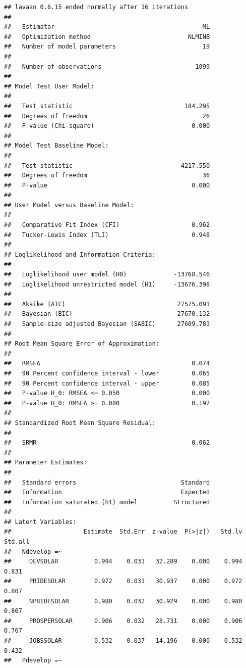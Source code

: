 \documentclass[
]{article}
\begin{document}
\begin{verbatim}
## lavaan 0.6.15 ended normally after 16 iterations
## 
##   Estimator                                         ML
##   Optimization method                           NLMINB
##   Number of model parameters                        19
## 
##   Number of observations                          1099
## 
## Model Test User Model:
##                                                       
##   Test statistic                               184.295
##   Degrees of freedom                                26
##   P-value (Chi-square)                           0.000
## 
## Model Test Baseline Model:
## 
##   Test statistic                              4217.550
##   Degrees of freedom                                36
##   P-value                                        0.000
## 
## User Model versus Baseline Model:
## 
##   Comparative Fit Index (CFI)                    0.962
##   Tucker-Lewis Index (TLI)                       0.948
## 
## Loglikelihood and Information Criteria:
## 
##   Loglikelihood user model (H0)             -13768.546
##   Loglikelihood unrestricted model (H1)     -13676.398
##                                                       
##   Akaike (AIC)                               27575.091
##   Bayesian (BIC)                             27670.132
##   Sample-size adjusted Bayesian (SABIC)      27609.783
## 
## Root Mean Square Error of Approximation:
## 
##   RMSEA                                          0.074
##   90 Percent confidence interval - lower         0.065
##   90 Percent confidence interval - upper         0.085
##   P-value H_0: RMSEA <= 0.050                    0.000
##   P-value H_0: RMSEA >= 0.080                    0.192
## 
## Standardized Root Mean Square Residual:
## 
##   SRMR                                           0.062
## 
## Parameter Estimates:
## 
##   Standard errors                             Standard
##   Information                                 Expected
##   Information saturated (h1) model          Structured
## 
## Latent Variables:
##                    Estimate  Std.Err  z-value  P(>|z|)   Std.lv  Std.all
##   Ndevelop =~                                                           
##     DEVSOLAR          0.994    0.031   32.289    0.000    0.994    0.831
##     PRIDESOLAR        0.972    0.031   30.937    0.000    0.972    0.807
##     NPRIDESOLAR       0.980    0.032   30.929    0.000    0.980    0.807
##     PROSPERSOLAR      0.906    0.032   28.731    0.000    0.906    0.767
##     JOBSSOLAR         0.532    0.037   14.196    0.000    0.532    0.432
##   Pdevelop =~                                                           

\end{verbatim}
\end{document}
